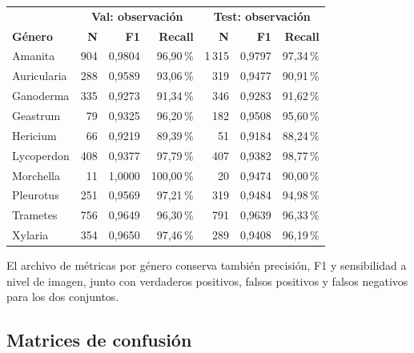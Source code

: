 \documentclass[11pt,a4paper]{article}
\begin{document}
\begin{center}\small\begin{tabular}{lrrrrrr}\toprule
& \multicolumn{3}{c}{\textbf{Val: observación}} & \multicolumn{3}{c}{\textbf{Test: observación}}\\
\textbf{Género} & \textbf{N} & \textbf{F1} & \textbf{Recall} & \textbf{N} & \textbf{F1} & \textbf{Recall}\\
\midrule
Amanita & 904 & 0,9804 & 96,90\,\% & 1\,315 & 0,9797 & 97,34\,\%\\
Auricularia & 288 & 0,9589 & 93,06\,\% & 319 & 0,9477 & 90,91\,\%\\
Ganoderma & 335 & 0,9273 & 91,34\,\% & 346 & 0,9283 & 91,62\,\%\\
Geastrum & 79 & 0,9325 & 96,20\,\% & 182 & 0,9508 & 95,60\,\%\\
Hericium & 66 & 0,9219 & 89,39\,\% & 51 & 0,9184 & 88,24\,\%\\
Lycoperdon & 408 & 0,9377 & 97,79\,\% & 407 & 0,9382 & 98,77\,\%\\
Morchella & 11 & 1,0000 & 100,00\,\% & 20 & 0,9474 & 90,00\,\%\\
Pleurotus & 251 & 0,9569 & 97,21\,\% & 319 & 0,9484 & 94,98\,\%\\
Trametes & 756 & 0,9649 & 96,30\,\% & 791 & 0,9639 & 96,33\,\%\\
Xylaria & 354 & 0,9650 & 97,46\,\% & 289 & 0,9408 & 96,19\,\%\\
\bottomrule\end{tabular}\end{center}

El archivo de métricas por género conserva también precisión, F1 y
sensibilidad a nivel de imagen, junto con verdaderos positivos, falsos
positivos y falsos negativos para los dos conjuntos.

\subsection{Matrices de confusión}
\end{document}
